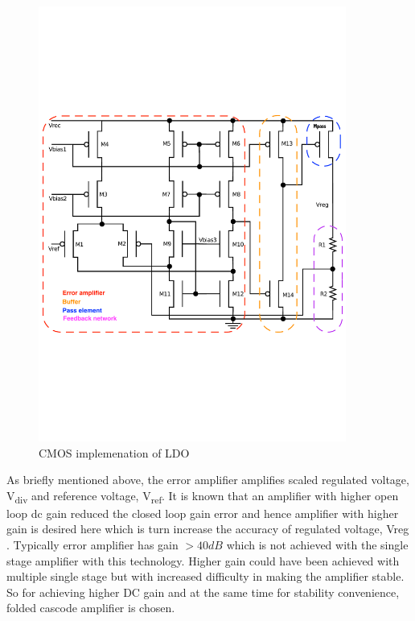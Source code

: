 \documentclass[12pt,a4paper,UKenglish]{article}
\begin{document}
\begin{figure}[htbp] %
   \centering
   \includegraphics[width=0.9\textwidth]{img/sch_ldo_label.pdf} 
   \caption{CMOS implemenation of LDO}
   \label{ldo_cmos}
\end{figure}

As briefly mentioned above, the error amplifier amplifies scaled regulated voltage, V\textsubscript{div} and reference voltage, V\textsubscript{ref}. It is known that an amplifier with higher open loop \acrshort{dc} gain reduced the closed loop gain error and hence amplifier with higher gain is desired here which is turn increase the accuracy of regulated voltage, Vreg \cite{ldo_bulkmod}. Typically error amplifier has gain $> 40 dB$ which is not achieved with the single stage amplifier with this technology. Higher gain could have been achieved with multiple single stage but with increased difficulty in making the amplifier stable. So for achieving higher DC gain and at the same time for stability convenience, folded cascode amplifier \cite[pp. xx]{razavi_2001} is chosen. \\
\end{document}
